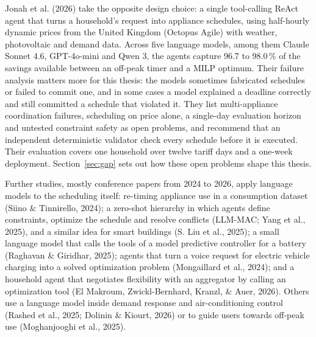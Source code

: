 \documentclass[12pt,a4paper]{report}
\begin{document}
Jonah et al. (2026) take the opposite design choice: a single
tool-calling ReAct agent that turns a household's request into appliance
schedules, using half-hourly dynamic prices from the United Kingdom
(Octopus Agile) with weather, photovoltaic and demand data. Across five
language models, among them Claude Sonnet 4.6, GPT-4o-mini and Qwen 3,
the agents capture 96.7 to 98.0\,\% of the savings available between an
off-peak timer and a MILP optimum. Their failure analysis matters more
for this thesis: the models sometimes fabricated schedules or failed to
commit one, and in some cases a model explained a deadline correctly and
still committed a schedule that violated it. They list multi-appliance
coordination failures, scheduling on price alone, a single-day
evaluation horizon and untested constraint safety as open problems, and
recommend that an independent deterministic validator check every
schedule before it is executed. Their evaluation covers one household
over twelve tariff days and a one-week deployment.
Section~\ref{sec:gap} sets out how these open problems shape this
thesis.

Further studies, mostly conference papers from 2024 to 2026, apply
language models to the scheduling itself: re-timing appliance use in a
consumption dataset (Siino \& Tinnirello, 2024); a zero-shot hierarchy in
which agents define constraints, optimize the schedule and resolve
conflicts (LLM-MAC; Yang et al., 2025), and a similar idea for smart
buildings (S. Liu et al., 2025); a small language model that calls the
tools of a model predictive controller for a battery (Raghavan \&
Giridhar, 2025); agents that turn a voice request for electric vehicle
charging into a solved optimization problem (Mongaillard et al., 2024);
and a household agent that negotiates flexibility with an aggregator by
calling an optimization tool (El Makroum, Zwickl-Bernhard, Kranzl, \&
Auer, 2026). Others use a language model inside demand response and
air-conditioning control (Rashed et al., 2025; Dolinin \& Kiourt, 2026)
or to guide users towards off-peak use (Moghanjooghi et al., 2025).
\end{document}
